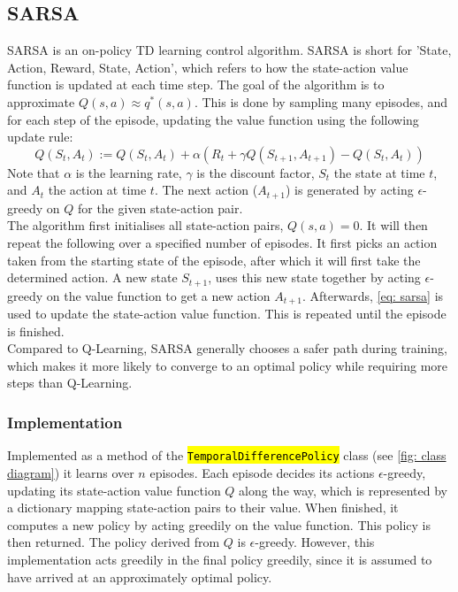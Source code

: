 \documentclass{class}
\def\code#1{\hl{\texttt{#1}}}
\begin{document}
\subsection{SARSA}
\label{subsec: sarsa}
SARSA is an on-policy TD learning control algorithm. SARSA is short for 'State, Action, Reward, State, Action', which refers to how the state-action value function is updated at each time step. The goal of the algorithm is to approximate $Q(s,a) \approx q^*(s,a)$. This is done by sampling many episodes, and for each step of the episode, updating the value function using the following update rule:
\begin{equation}
    \label{eq: sarsa}
    Q(S_t,A_t) := Q(S_t,A_t) + \alpha(R_t + \gamma Q(S_{t+1}, A_{t+1}) - Q(S_t, A_t))
\end{equation}
Note that $\alpha$ is the learning rate, $\gamma$ is the discount factor, $S_t$ the state at time $t$, and $A_t$ the action at time $t$. The next action ($A_{t+1}$) is generated by acting $\epsilon$-greedy on $Q$ for the given state-action pair. 
\\[0.3cm]
The algorithm first initialises all state-action pairs, $Q(s,a) = 0$. It will then repeat the following over a specified number of episodes. It first picks an action taken from the starting state of the episode, after which it will first take the determined action. A new state $S_{t+1}$, uses this new state together by acting $\epsilon$-greedy on the value function to get a new action $A_{t+1}$. Afterwards, \autoref{eq: sarsa} is used to update the state-action value function. This is repeated until the episode is finished.
\\[0.3cm]
Compared to Q-Learning, SARSA generally chooses a safer path during training, which makes it more likely to converge to an optimal policy while requiring more steps than Q-Learning.

\subsubsection*{Implementation}
Implemented as a method of the \code{TemporalDifferencePolicy} class (see \autoref{fig: class diagram}) it learns over $n$ episodes. Each episode decides its actions $\epsilon$-greedy, updating its state-action value function $Q$ along the way, which is represented by a dictionary mapping state-action pairs to their value. When finished, it computes a new policy by acting greedily on the value function. This policy is then returned. The policy derived from $Q$ is $\epsilon$-greedy. However, this implementation acts greedily in the final policy greedily, since it is assumed to have arrived at an approximately optimal policy. 
\end{document}
